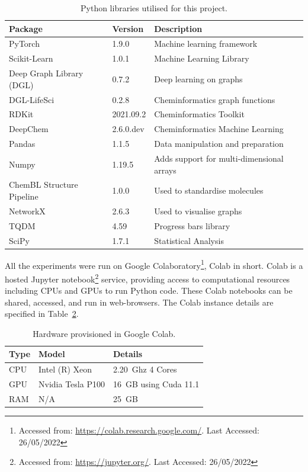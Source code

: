 \begin{table}
	\centering
	\begin{tabular}{@{}lll@{}}
		\hline
		\textbf{Package} & \textbf{Version} & \textbf{Description} \\
		\hline
		PyTorch & 1.9.0 & Machine learning framework \\
		Scikit-Learn & 1.0.1 & Machine Learning Library \\
		Deep Graph Library (DGL) & 0.7.2 & Deep learning on graphs \\
		DGL-LifeSci & 0.2.8 & Cheminformatics graph functions \\
		RDKit & 2021.09.2 & Cheminformatics Toolkit \\
		DeepChem & 2.6.0.dev & Cheminformatics Machine Learning \\
		Pandas & 1.1.5 & Data manipulation and preparation \\
		Numpy & 1.19.5 & Adds support for multi-dimensional arrays \\
		ChemBL Structure Pipeline & 1.0.0 & Used to standardise molecules \\
		NetworkX & 2.6.3 & Used to visualise graphs \\
		TQDM & 4.59 & Progress bars library \\
		SciPy & 1.7.1 & Statistical Analysis \\
		\hline
	\end{tabular}
	\caption{Python libraries utilised for this project.}
	\label{tab:versions}
\end{table}

All the experiments were run on Google Colaboratory\footnote{Accessed from: \url{https://colab.research.google.com/}. Last Accessed: 26/05/2022}, Colab in short. Colab is a hosted Jupyter notebook\footnote{Accessed from: \url{https://jupyter.org/}. Last Accessed: 26/05/2022} service, providing access to computational resources including CPUs and GPUs to run Python code. These Colab notebooks can be shared, accessed, and run in web-browsers.  The Colab instance details are specified in Table~\ref{tab:hardware}.

\begin{table}
	\centering
	\begin{tabular}{@{}lll@{}}
		\hline
		\textbf{Type} & \textbf{Model} & \textbf{Details} \\
		\hline
		CPU & Intel (R) Xeon & 2.20~Ghz 4 Cores \\
		GPU & Nvidia Tesla P100 & 16~GB using Cuda 11.1 \\
		RAM & N/A & 25~GB \\
		\hline
	\end{tabular}
	\caption{Hardware provisioned in Google Colab.}
	\label{tab:hardware}
\end{table}
